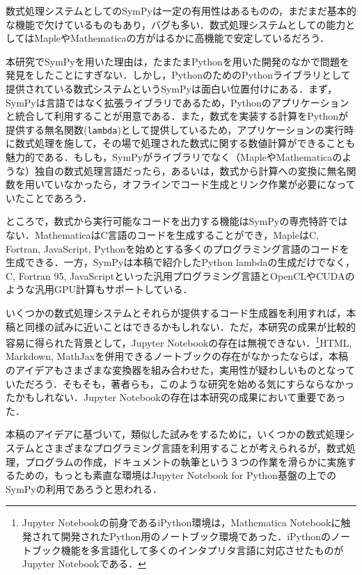 数式処理システムとしてのSymPyは一定の有用性はあるものの，まだまだ基本的な機能で欠けているものもあり，バグも多い．数式処理システムとしての能力としてはMapleやMathematicaの方がはるかに高機能で安定しているだろう．

本研究でSymPyを用いた理由は，たまたまPythonを用いた開発のなかで問題を発見をしたことにすぎない．しかし，PythonのためのPythonライブラリとして提供されている数式システムというSymPyは面白い位置付けにある．まず，SymPyは言語ではなく拡張ライブラリであるため，Pythonのアプリケーションと統合して利用することが用意である．また，数式を実装する計算をPythonが提供する無名関数(\verb|lambda|)として提供しているため，アプリケーションの実行時に数式処理を施して，その場で処理された数式に関する数値計算ができることも魅力的である．もしも，SymPyがライブラリでなく（MapleやMathematicaのような）独自の数式処理言語だったら，あるいは，数式から計算への変換に無名関数を用いていなかったら，オフラインでコード生成とリンク作業が必要になっていたことであろう．

ところで，数式から実行可能なコードを出力する機能はSymPyの専売特許ではない．MathematicaはC言語のコードを生成することができ，MapleはC, Fortran, JavaScript, Pythonを始めとする多くのプログラミング言語のコードを生成できる．一方，SymPyは本稿で紹介したPython lambdaの生成だけでなく，C, Fortran 95, JavaScriptといった汎用プログラミング言語とOpenCLやCUDAのような汎用GPU計算もサポートしている．

いくつかの数式処理システムとそれらが提供するコード生成器を利用すれば，本稿と同様の試みに近いことはできるかもしれない．ただ，本研究の成果が比較的容易に得られた背景として，Jupyter Notebookの存在は無視できない．\footnote {Jupyter Notebookの前身であるiPython環境\cite{perez-2007-ipython-a-system-for-interactive-scientific-computing}は，Mathematica Notebookに触発されて開発されたPython用のノートブック環境であった．iPythonのノートブック機能を多言語化して多くのインタプリタ言語に対応させたものがJupyter Notebookである．\cite{jupyter-2016-notebooks}}HTML, Markdown, MathJaxを併用できるノートブックの存在がなかったならば，本稿のアイデアもさまざまな変換器を組み合わせた，実用性が疑わしいものとなっていただろう．そもそも，著者らも，このような研究を始める気にすらならなかったかもしれない．Jupyter Notebookの存在は本研究の成果において重要であった．

本稿のアイデアに基づいて，類似した試みをするために，いくつかの数式処理システムとさまざまなプログラミング言語を利用することが考えられるが，数式処理，プログラムの作成，ドキュメントの執筆という３つの作業を滑らかに実施するための，もっとも素直な環境はJupyter Notebook for Python基盤の上でのSymPyの利用であろうと思われる．
